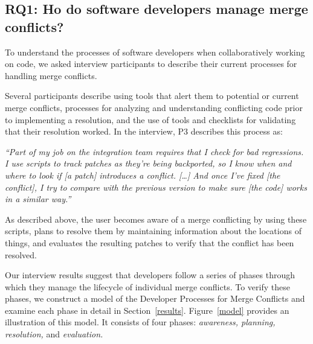 
\subsection{\textbf{RQ1:} Ho do software developers manage merge conflicts?}\label{RQ1}

To understand the processes of software developers when collaboratively working on code, we asked interview participants to describe their current processes for handling merge conflicts.

Several participants describe using tools that alert them to potential or current merge conflicts, processes for analyzing and understanding conflicting code prior to implementing a resolution, and the use of tools and checklists for validating that their resolution worked.
In the interview, P3 describes this process as:
\begin{quoting}
\textit{``Part of my job on the integration team requires that I check for bad regressions. I use scripts to track patches as they're being backported, so I know when and where to look if [a patch] introduces a conflict. [\ldots] And once I've fixed [the conflict], I try to compare with the previous version to make sure [the code] works in a similar way.''}
\end{quoting}
As described above, the user becomes aware of a merge conflicting by using these scripts, plans to resolve them by maintaining information about the locations of things, and evaluates the resulting patches to verify that the conflict has been resolved.

Our interview results suggest that developers follow a series of phases through which they manage the lifecycle of individual merge conflicts.
To verify these phases, we construct a model of the Developer Processes for Merge Conflicts and examine each phase in detail in Section~\ref{results}.
Figure~\ref{model} provides an illustration of this model. 
It consists of four phases: \emph{awareness, planning, resolution,} and \emph{evaluation.}

